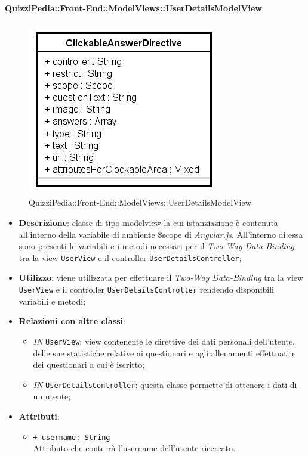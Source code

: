 \paragraph{QuizziPedia::Front-End::ModelViews::UserDetailsModelView}
		
		\label{QuizziPedia::Front-End::ModelViews::UserDetailsModelView}
		
		\begin{figure}[ht]
			\centering
			\includegraphics[scale=0.5,keepaspectratio]{UML/Classi/Front-End/QuizziPedia_Front-end_Templates_ClickableAnswerTemplate.png}
			\caption{QuizziPedia::Front-End::ModelViews::UserDetailsModelView}
		\end{figure} \FloatBarrier
		
		\begin{itemize}
			\item \textbf{Descrizione}: classe di tipo modelview la cui istanziazione è contenuta all'interno della variabile di ambiente \$scope di \textit{Angular.js}. All'interno di essa sono presenti le variabili e i metodi necessari per il \textit{Two-Way Data-Binding} tra la view \texttt{UserView} e il controller \texttt{UserDetailsController};
			\item \textbf{Utilizzo}: viene utilizzata per effettuare il \textit{Two-Way Data-Binding} tra la view \texttt{UserView} e il controller \texttt{UserDetailsController} rendendo disponibili variabili e metodi;
			\item \textbf{Relazioni con altre classi}: 
			\begin{itemize}
				\item \textit{IN} \texttt{UserView}: view contenente le direttive dei dati personali dell'utente, delle sue statistiche relative ai questionari e agli allenamenti effettuati e dei questionari a cui è iscritto; 
				\item \textit{IN} \texttt{UserDetailsController}: questa classe permette di ottenere i dati di un utente;
			\end{itemize}
			\item \textbf{Attributi}: 
			\begin{itemize}
				\item \texttt{+ username: String} \\ Attributo che conterrà l'username dell'utente ricercato.
			\end{itemize}
		\end{itemize}
		
			